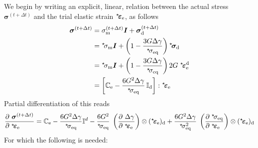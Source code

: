 \documentclass[times,namecite]{goose-article}
\newcommand\leftstar[1]{\hspace*{-.3em}~^\star\!#1}
\begin{document}
We begin by writing an explicit, linear, relation between the actual stress $\bm{\sigma}^{(t+\Delta t)}$ and the trial elastic strain $\leftstar{\bm{\varepsilon}}_\mathrm{e}$, as follows
\begin{align}
  \bm{\sigma}^{(t+\Delta t)}
    &= \sigma_\mathrm{m}^{(t+\Delta t)} \bm{I}
     + \bm{\sigma}_\mathrm{d}^{(t+\Delta t)}
    \\
    &= \leftstar{\sigma}_\mathrm{m} \bm{I}
    + \left( 1- \frac{3 G \Delta \gamma}{\leftstar{\sigma}_\mathrm{eq}} \right)
      \leftstar{\bm{\sigma}}_\mathrm{d}
    \\
    &= \leftstar{\sigma}_\mathrm{m} \bm{I}
     + \left( 1-\frac{3 G \Delta\gamma}{\leftstar{\sigma}_\mathrm{eq}} \right)
       2 G \; \leftstar{\bm{\varepsilon}}_\mathrm{e}^\mathrm{d}
    \\
    &=
    \left[
      \mathbb{C}_\mathrm{e} -
      \frac{6 G^2 \Delta \gamma}{\leftstar{\sigma}_\mathrm{eq}} \, \mathbb{I}_\mathrm{d}
    \right] : \leftstar{\bm{\varepsilon}}_\mathrm{e}
\end{align}
Partial differentiation of this reads
\begin{align}
\frac{
  \partial ~\bm{\sigma}^{(t+\Delta t)} \hfill
}{
  \partial \;\leftstar{\bm{\varepsilon}}_\mathrm{e} \hfill
} =
\mathbb{C}_\mathrm{e}
- \frac{6 G^2 \Delta \gamma}{\leftstar{\sigma}_\mathrm{eq}} \mathbb{I}^d
- \frac{6 G^2}{\leftstar{\sigma}_\mathrm{eq}} \;
\left( \frac{
  \partial ~\Delta \gamma \hfill
}{
  \partial \;\leftstar{\bm{\varepsilon}}_\mathrm{e} \hfill
} \right) \otimes
(\leftstar{\bm{\varepsilon}}_\mathrm{e})_\mathrm{d}
+ \frac{6 G^2 \Delta \gamma}{\leftstar{\sigma}_\mathrm{eq}^2} \;
\left( \frac{
  \partial \;\leftstar{\sigma}_\mathrm{eq} \hfill
}{
  \partial \;\leftstar{\bm{\varepsilon}}_\mathrm{e} \hfill
} \right) \otimes
(\leftstar{\bm{\varepsilon}}_\mathrm{e})_\mathrm{d}
\end{align}
For which the following is needed:
\end{document}
